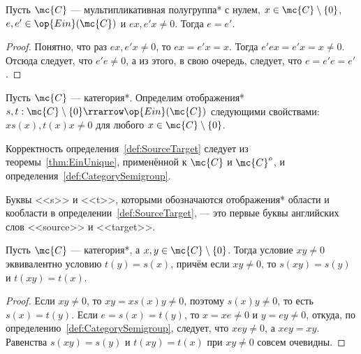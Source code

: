 \documentclass[
	extrafontsizes,
	11pt,
	hyphens,
]{memoir}
\begin{document}
\begin{theorem}
\label{thm:EinUnique}
Пусть \(\mc{C}\) --- мультипликативная полугруппа* с нулем, \(x \in \mc{C} \setminus \{0\}\), \(e, e' \in \op{Ein}(\mc{C})\) и \(ex, e'x \neq 0\). Тогда \(e = e'\).
\end{theorem}

\begin{proof}
Понятно, что раз \(ex, e'x \neq 0\), то \(ex = e'x = x\). Тогда \(e'ex = e'x = x \neq 0\). Отсюда следует, что \(e'e \neq 0\), а из этого, в свою очередь, следует, что \(e = e'e = e'\).
\end{proof}

\begin{definition}
\label{def:SourceTarget}
Пусть \(\mc{C}\) --- категория*. Оп\-ре\-де\-лим
отображения* \(s,t : \mc{C} \setminus \{0\} \rrarrow \op{Ein}(\mc{C})\) следующими свойствами: \(x s(x), t(x) x \neq 0\) для любого \(x \in \mc{C} \setminus \{0\}\).
\end{definition}

\begin{remark}
Корректность определения~\ref{def:SourceTarget} следует из теоремы~\ref{thm:EinUnique}, применённой к \(\mc{C}\) и \(\mc{C}^o\), и определения~\ref{def:CategorySemigroup}. 
\end{remark}

\begin{remark}
Буквы <<\textenglish{s}>> и <<\textenglish{t}>>, которыми обозначаются отображения* области и кообласти в определении~\ref{def:SourceTarget}, --- это первые буквы английских слов <<\textenglish{source}>> и <<\textenglish{target}>>.
\end{remark}

\begin{theorem}
Пусть \(\mc{C}\) --- категория*, а \(x, y \in \mc{C} \setminus \{0\}\). Тогда условие \(xy \neq 0\) эквивалентно условию \(t(y) = s(x)\), причём если \(xy \neq 0\), то \(s(xy) = s(y)\) и \(t(xy) = t(x)\).
\end{theorem}

\begin{proof}

Если \(xy \neq 0\), то \(xy = x s(x) y \neq 0\), поэтому \(s(x) y \neq 0\), то есть \(s(x) = t(y)\).
Если \(e = s(x) = t(y)\), то \(x = xe \neq 0\) и \(y = ey \neq 0\), откуда, по определению~\ref{def:CategorySemigroup}, следует, что \(xey \neq 0\), а \(xey = xy\).
Равенства \(s(xy) = s(y)\) и \(t(xy) = t(x)\) при \(xy \neq 0\) совсем очевидны.
\end{proof}
\end{document}
